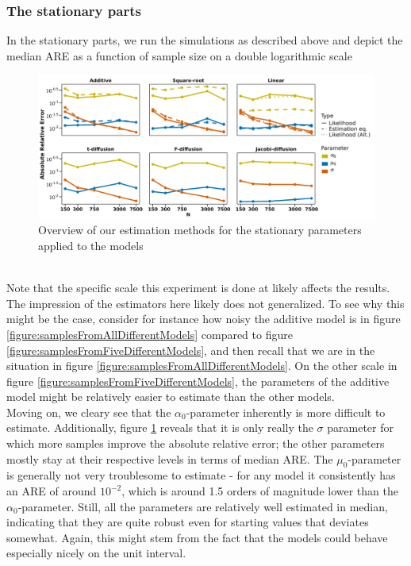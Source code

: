 \subsubsection{The stationary parts}
In the stationary parts, we run the simulations as described above and depict the median ARE as a function of sample size on a double logarithmic scale
\begin{figure}[h]
    \begin{center}
    \includegraphics[scale = .1]{figures/parameter_precision_stationary.jpeg}
    \caption{Overview of our estimation methods for the stationary parameters applied to the models}
    \label{figure:overviewOfEstimatorsStationary}
    \end{center}
\end{figure}\\
Note that the specific scale this experiment is done at likely affects the results. The impression of the estimators here likely does not generalized. To see why this might be the case, consider for instance how noisy the additive model is in figure \ref{figure:samplesFromAllDifferentModels} compared to figure \ref{figure:samplesFromFiveDifferentModels}, and then recall that we are in the situation in figure \ref{figure:samplesFromAllDifferentModels}. On the other scale in figure \ref{figure:samplesFromFiveDifferentModels}, the parameters of the additive model might be relatively easier to estimate than the other models.\\
Moving on, we cleary see that the $\alpha_0$-parameter inherently is more difficult to estimate. Additionally, figure \ref{figure:overviewOfEstimatorsStationary} reveals that it is only really the $\sigma$ parameter for which more samples improve the absolute relative error; the other parameters mostly stay at their respective levels in terms of median ARE. The $\mu_0$-parameter is generally not very troublesome to estimate - for any model it consistently has an ARE of around $10^{-2}$, which is around 1.5 orders of magnitude lower than the $\alpha_0$-parameter. Still, all the parameters are relatively well estimated in median, indicating that they are quite robust even for starting values that deviates somewhat. Again, this might stem from the fact that the models could behave especially nicely on the unit interval.\\

